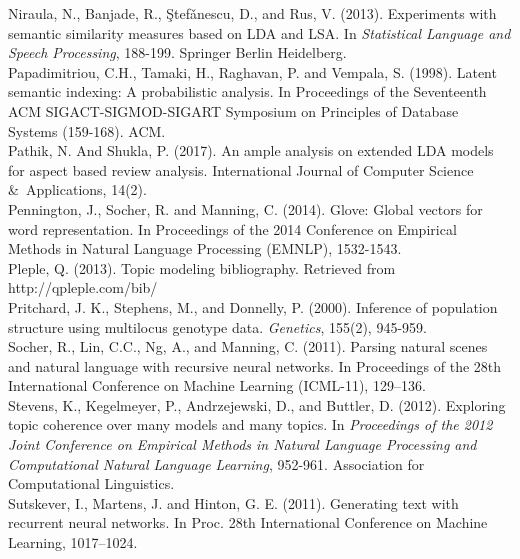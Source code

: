 \documentclass[11pt]{article}
\begin{document}
Niraula, N., Banjade, R., \c{S}tef\v{a}nescu, D., and Rus, V. (2013). Experiments with semantic similarity measures based on LDA and LSA. In \emph{Statistical Language and Speech Processing}, 188-199. Springer Berlin Heidelberg.\\
\newline
Papadimitriou, C.H., Tamaki, H., Raghavan, P. and Vempala, S. (1998). Latent semantic indexing: A probabilistic analysis. In Proceedings of the Seventeenth ACM SIGACT-SIGMOD-SIGART Symposium on Principles of Database Systems (159-168). ACM.\\
\newline
Pathik, N. And Shukla, P. (2017). An ample analysis on extended LDA models for aspect based review analysis. International Journal of Computer Science \&\ Applications, 14(2).\\
\newline
Pennington, J., Socher, R. and Manning, C.  (2014). Glove: Global vectors for word representation. In Proceedings of the 2014 Conference on Empirical Methods in Natural Language Processing (EMNLP), 1532-1543.\\
\newline
Pleple, Q. (2013). Topic modeling bibliography. Retrieved from http://qpleple.com/bib/\\
\newline
Pritchard, J. K., Stephens, M., and Donnelly, P. (2000). Inference of population structure using multilocus genotype data. \emph{Genetics}, 155(2), 945-959.\\
\newline
Socher, R., Lin, C.C., Ng, A., and Manning, C. (2011). Parsing natural scenes and natural language with recursive neural networks. In Proceedings of the 28th International Conference on Machine Learning (ICML-11), 129–136.\\
\newline
Stevens, K., Kegelmeyer, P., Andrzejewski, D., and Buttler, D. (2012). Exploring topic coherence over many models and many topics. In \emph{Proceedings of the 2012 Joint Conference on Empirical Methods in Natural Language Processing and Computational Natural Language Learning}, 952-961. Association for Computational Linguistics.\\
\newline
Sutskever, I., Martens, J. and Hinton, G. E. (2011). Generating text with recurrent neural networks. In Proc. 28th International Conference on Machine Learning, 1017–1024.\\
\newline
\end{document}
